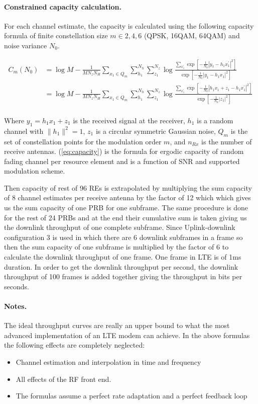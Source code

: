 \documentclass[a4paper,10pt]{article}
\begin{document}
\paragraph{Constrained capacity calculation.}
For each channel estimate, the capacity is calculated using the following capacity formula of finite constellation size $m \in {2,4,6}$ (QPSK, 16QAM, 64QAM) and noise variance $N_0$.

\begin{align}
C_m\left(N_0\right)
&=\log M-\frac{1}{MN_{z}N_{H}}\sum_{x_{1}\in{Q_m}}\sum_{h_1}^{N_{h}}\sum_{z_{1}}^{N_{z}}\log\frac{\sum_{x^{'}_{1}}\exp\left[-\frac{1}{N_{0}}\left|y_{1}-h_{1}x^{'}_{1}\right|^2\right]}{\exp\left[-\frac{1}{N_{0}}\left|y_{1}-h_{1}x_{1}\right|^{2}\right]}\nonumber\\
&=\log M-\frac{1}{MN_{z}N_{H}}\sum_{x_{1}\in{Q_m}}\sum_{h_1}^{N_{h}}\sum_{z_{1}}^{N_{z}}\log\frac{\sum_{x^{'}_{1}}\exp\left[-\frac{1}{N_{0}}\left|h_{1}x_{1} + z_1 - h_1x^{'}_{1}\right|^2\right]}{\exp\left[-\frac{1}{N_{0}}\left|z_{1}\right|^{2}\right]}\nonumber\\
\label{eq:capacity}
\end{align}

Where $y_1 = h_1x_1 + z_1$ is the received signal at the receiver, $h_1$ is a random channel with $\|h_1\|^2=1$, $z_1$ is a circular symmetric Gaussian noise, $Q_m$ is the set of constellation points for the modulation order $m$, and $n_{Rx}$ is the number of receive antennas. (\ref{eq:capacity}) is the formula for ergodic capacity of random fading channel per resource element and is a function of SNR and supported modulation scheme. 


Then capacity of rest of 96 REs is extrapolated by multiplying the sum capacity of 8 channel estimates per receive antenna by the factor of 12 which which gives us the sum capacity of one PRB for one subframe. The same procedure is done for the rest of 24 PRBs and at the end their cumulative sum is taken giving us the downlink throughput of one complete subframe. Since Uplink-downlink configuration 3 is used in which there are 6 downlink subframes in a frame so then the sum capacity of one subframe is multiplied by the factor of 6 to calculate the downlink throughput of one frame. One frame in LTE is of 1ms duration. In order to get the downlink throughput per second, the downlink throughput of 100 frames is added together giving the throughput in bits per seconds.

\paragraph{Notes.}
The ideal throughput curves are really an upper bound to what the most advanced implementation of an LTE modem can achieve. In the above formulas the following effects are completely neglected:
\begin{itemize}
 \item Channel estimation and interpolation in time and frequency
 \item All effects of the RF front end.
 \item The formulas assume a perfect rate adaptation and a perfect feedback loop
\end{itemize}
\end{document}
